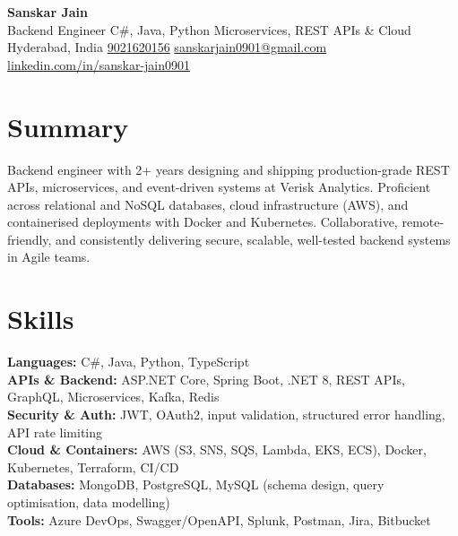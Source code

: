 \documentclass[10pt,letterpaper]{article}
\begin{document}
\begin{center}
    {\Large \textbf{Sanskar Jain}} \\[2pt]
    Backend Engineer \textbar{} C\#, Java, Python \textbar{} Microservices, REST APIs \& Cloud \\[2pt]
    Hyderabad, India \enspace\textbar\enspace
    \href{tel:9021620156}{9021620156} \enspace\textbar\enspace
    \href{mailto:sanskarjain0901@gmail.com}{sanskarjain0901@gmail.com} \enspace\textbar\enspace
    \href{https://www.linkedin.com/in/sanskar-jain0901/}{linkedin.com/in/sanskar-jain0901}
\end{center}

\section*{Summary}
Backend engineer with 2+ years designing and shipping production-grade REST APIs, microservices, and event-driven systems at Verisk Analytics.
Proficient across relational and NoSQL databases, cloud infrastructure (AWS), and containerised deployments with Docker and Kubernetes.
Collaborative, remote-friendly, and consistently delivering secure, scalable, well-tested backend systems in Agile teams.

\section*{Skills}
\textbf{Languages:} C\#, Java, Python, TypeScript \\
\textbf{APIs \& Backend:} ASP.NET Core, Spring Boot, .NET 8, REST APIs, GraphQL, Microservices, Kafka, Redis \\
\textbf{Security \& Auth:} JWT, OAuth2, input validation, structured error handling, API rate limiting \\
\textbf{Cloud \& Containers:} AWS (S3, SNS, SQS, Lambda, EKS, ECS), Docker, Kubernetes, Terraform, CI/CD \\
\textbf{Databases:} MongoDB, PostgreSQL, MySQL (schema design, query optimisation, data modelling) \\
\textbf{Tools:} Azure DevOps, Swagger/OpenAPI, Splunk, Postman, Jira, Bitbucket

\end{document}
